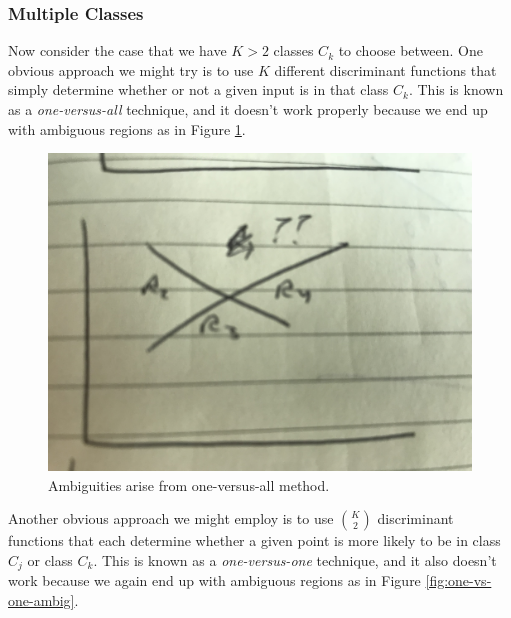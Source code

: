 
\subsubsection{Multiple Classes}
Now consider the case that we have $K > 2$ classes $C_{k}$ to choose between. One obvious approach we might try is to use $K$ different discriminant functions that simply determine whether or not a given input is in that class $C_{k}$. This is known as a \textit{one-versus-all} technique, and it doesn't work properly because we end up with ambiguous regions as in Figure \ref{fig:one-vs-all-ambig}.

\begin{figure}
    \centering
    \includegraphics[width=0.5\paperwidth]{../Classification/fig/one_vs_all_ambig.jpg}
    \caption{Ambiguities arise from one-versus-all method.}
    \label{fig:one-vs-all-ambig}
\end{figure}

Another obvious approach we might employ is to use $\binom{K}{2}$ discriminant functions that each determine whether a given point is more likely to be in class $C_{j}$ or class $C_{k}$. This is known as a \textit{one-versus-one} technique, and it also doesn't work because we again end up with ambiguous regions as in Figure \ref{fig:one-vs-one-ambig}.

